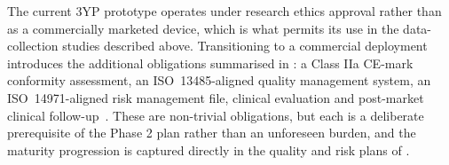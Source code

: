 The current 3YP prototype operates under research ethics approval rather than as a commercially marketed device, which is what permits its use in the data-collection studies described above. Transitioning to a commercial deployment introduces the additional obligations summarised in : a Class IIa CE-mark conformity assessment, an ISO~13485-aligned quality management system, an ISO~14971-aligned risk management file, clinical evaluation and post-market clinical follow-up~\cite{iso13485,iso14971,eu_md_manufacturers}. These are non-trivial obligations, but each is a deliberate prerequisite of the Phase 2 plan rather than an unforeseen burden, and the maturity progression is captured directly in the quality and risk plans of .
